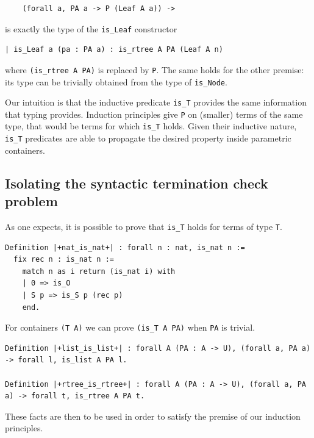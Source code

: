 \documentclass[a4paper,UKenglish,cleveref, autoref]{lipics-v2019}
\begin{document}
\begin{lstlisting}
    (forall a, PA a -> P (Leaf A a)) ->
\end{lstlisting}

\noindent
is exactly the type of the \lstinline+is_Leaf+ constructor

\begin{lstlisting}
| is_Leaf a (pa : PA a) : is_rtree A PA (Leaf A n)
\end{lstlisting}

\noindent
where \lstinline+(is_rtree A PA)+ is replaced by \lstinline+P+.
The same holds for the other premise: its type can be trivially
obtained from the type of \lstinline+is_Node+.

Our intuition is that the inductive predicate \lstinline+is_T+
provides the same information that typing provides. Induction
principles give \lstinline+P+ on (smaller) terms of the same type,
that would be terms for which \lstinline+is_T+ holds.
Given their inductive nature, \lstinline+is_T+ predicates
are able to propagate the desired property inside parametric
containers.

\subsection{Isolating the syntactic termination check problem} %
\label{sec:idea:transparent}

As one expects, it is possible to prove that \lstinline+is_T+
holds for terms of type \lstinline+T+.

\begin{lstlisting}
Definition |+nat_is_nat+| : forall n : nat, is_nat n :=
  fix rec n : is_nat n :=
    match n as i return (is_nat i) with
    | 0 => is_O
    | S p => is_S p (rec p)
    end.
\end{lstlisting}

\noindent
For containers \lstinline+(T A)+ we can prove \lstinline+(is_T A PA)+
when \lstinline+PA+ is trivial.

\begin{lstlisting}
Definition |+list_is_list+| : forall A (PA : A -> U), (forall a, PA a) -> forall l, is_list A PA l.

Definition |+rtree_is_rtree+| : forall A (PA : A -> U), (forall a, PA a) -> forall t, is_rtree A PA t.
\end{lstlisting}

\noindent
These facts are then to be used in order to satisfy the
premise of our induction principles. 
\end{document}
